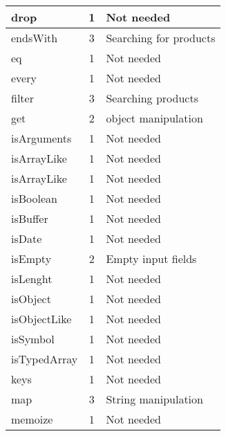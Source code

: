 \documentclass[a4paper, 12pt]{article}
\begin{document}
\begin{table}[h]
\begin{tabular}{l|c|l}
    drop         & 1                 & Not needed                            \\ \hline
    endsWith     & 3                 & Searching for products                \\ \hline
    eq           & 1                 & Not needed                            \\ \hline
    every        & 1                 & Not needed                            \\ \hline
    filter       & 3                 & Searching products                    \\ \hline
    get          & 2                 & object manipulation                   \\ \hline
    isArguments  & 1                 & Not needed                            \\ \hline
    isArrayLike  & 1                 & Not needed                            \\ \hline
    isArrayLike  & 1                 & Not needed                            \\ \hline
    isBoolean    & 1                 & Not needed                            \\ \hline
    isBuffer     & 1                 & Not needed                            \\ \hline
    isDate       & 1                 & Not needed                            \\ \hline
    isEmpty      & 2                 & Empty input fields                    \\ \hline
    isLenght     & 1                 & Not needed                            \\ \hline
    isObject     & 1                 & Not needed                            \\ \hline
    isObjectLike & 1                 & Not needed                            \\ \hline
    isSymbol     & 1                 & Not needed                            \\ \hline
    isTypedArray & 1                 & Not needed                            \\ \hline
    keys         & 1                 & Not needed                            \\ \hline
    map          & 3                 & String manipulation                   \\ \hline
    memoize      & 1                 & Not needed                            \\ \hline

\end{tabular}
\end{table}
\end{document}
